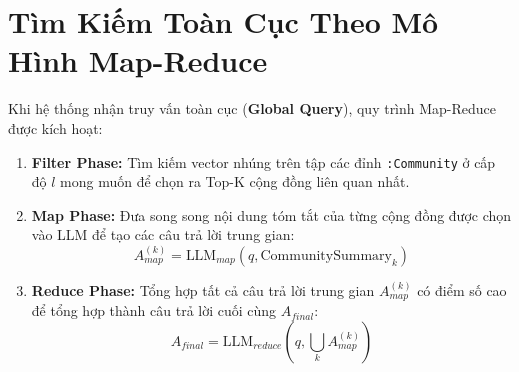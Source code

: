 \documentclass[11pt,a4paper]{report}
\begin{document}
\begin{center}
\end{center}

\section{Tìm Kiếm Toàn Cục Theo Mô Hình Map-Reduce}
Khi hệ thống nhận truy vấn toàn cục (\textbf{Global Query}), quy trình Map-Reduce được kích hoạt:
\begin{enumerate}
    \item \textbf{Filter Phase:} Tìm kiếm vector nhúng trên tập các đỉnh \texttt{:Community} ở cấp độ $l$ mong muốn để chọn ra Top-K cộng đồng liên quan nhất.
    \item \textbf{Map Phase:} Đưa song song nội dung tóm tắt của từng cộng đồng được chọn vào LLM để tạo các câu trả lời trung gian:
    \begin{equation}
    A_{map}^{(k)} = \text{LLM}_{map}(q, \text{CommunitySummary}_k)
    \end{equation}
    \item \textbf{Reduce Phase:} Tổng hợp tất cả câu trả lời trung gian $A_{map}^{(k)}$ có điểm số cao để tổng hợp thành câu trả lời cuối cùng $A_{final}$:
    \begin{equation}
    A_{final} = \text{LLM}_{reduce}\left( q, \bigcup_k A_{map}^{(k)} \right)
    \end{equation}
\end{enumerate}
\end{document}
